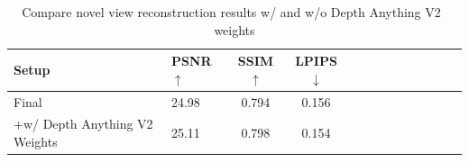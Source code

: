 \begin{table}[ht!]

    \begin{center}
    \begin{tabular}{llccccccccccc}
    \toprule
    Setup  & PSNR$\uparrow$ & SSIM$\uparrow$ & LPIPS$\downarrow$ \\
    \midrule
    \cellcolor{Gray}Final & \cellcolor{Gray}24.98 & \cellcolor{Gray}0.794 & \cellcolor{Gray}0.156 \\
    +w/ Depth Anything V2 Weights & 25.11  & 0.798  & 0.154 \\
    
    \bottomrule
    \end{tabular}
    \end{center}
    \caption{Compare novel view reconstruction results w/ and w/o Depth Anything V2~\protect\cite{yang2024depth} weights}
    \label{tab:depth_anything}
    
\end{table}